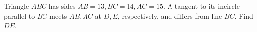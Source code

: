 Triangle $ABC$ has sides $AB=13,BC=14,AC=15$. A tangent to its incircle parallel to $BC$ meets $AB,AC$ at $D,E$, respectively, and differs from line $BC$. Find $DE$.
